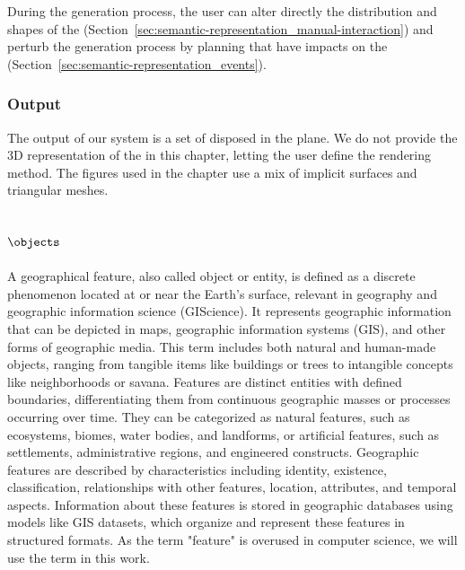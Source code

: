 During the generation process, the user can alter directly the distribution and shapes of the  (Section~\ref{sec:semantic-representation_manual-interaction}) and perturb the generation process by planning  that have impacts on the  (Section~\ref{sec:semantic-representation_events}).


\subsubsection{Output}
The output of our system is a set of  disposed in the plane. We do not provide the 3D representation of the  in this chapter, letting the user define the rendering method. The figures used in the chapter use a mix of implicit surfaces and triangular meshes.

\subsection{ $\objects$}
\label{sec:semantic-representation_environmental-objects}
A geographical feature, also called object or entity, is defined as a discrete phenomenon located at or near the Earth's surface, relevant in geography and geographic information science (GIScience). It represents geographic information that can be depicted in maps, geographic information systems (GIS), and other forms of geographic media. This term includes both natural and human-made objects, ranging from tangible items like buildings or trees to intangible concepts like neighborhoods or savana. Features are distinct entities with defined boundaries, differentiating them from continuous geographic masses or processes occurring over time. They can be categorized as natural features, such as ecosystems, biomes, water bodies, and landforms, or artificial features, such as settlements, administrative regions, and engineered constructs. Geographic features are described by characteristics including identity, existence, classification, relationships with other features, location, attributes, and temporal aspects. Information about these features is stored in geographic databases using models like GIS datasets, which organize and represent these features in structured formats. As the term "feature" is overused in computer science, we will use the term  in this work.

